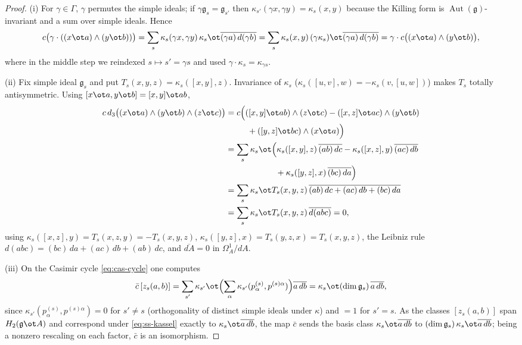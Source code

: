 \documentclass{amsart}
\theoremstyle{definition}
\DeclareMathOperator{\Aut}{Aut}
\newcommand{\g}{\mathfrak{g}}
\newcommand{\Om}{\Omega}
\newcommand{\Gm}{\Gamma}
\begin{document}
\begin{proof}
(i) For $\gamma\in\Gm$, $\gamma$ permutes the simple ideals; if
$\gamma\g_s=\g_{s'}$ then $\kappa_{s'}(\gamma x,\gamma y)=\kappa_s(x,y)$ because the
Killing form is $\Aut(\g)$-invariant and a sum over simple ideals.  Hence
\[
   c\bigl(\gamma\cdot((x\ot a)\wedge(y\ot b))\bigr)
   =\sum_s\kappa_s(\gamma x,\gamma y)\,\kappa_s\ot\overline{(\gamma a)\,d(\gamma b)}
   =\sum_{s}\kappa_{s}(x,y)\,(\gamma\kappa_{s})\ot\overline{(\gamma a)\,d(\gamma b)}
   =\gamma\cdot c\bigl((x\ot a)\wedge(y\ot b)\bigr),
\]
where in the middle step we reindexed $s\mapsto s'=\gamma s$ and used
$\gamma\cdot\kappa_s=\kappa_{\gamma s}$.

(ii) Fix simple ideal $\g_s$ and put $T_s(x,y,z)=\kappa_s([x,y],z)$.  Invariance of
$\kappa_s$ ($\kappa_s([u,v],w)=-\kappa_s(v,[u,w])$) makes $T_s$ totally
antisymmetric.  Using $[x\ot a,y\ot b]=[x,y]\ot ab$,
\[
\begin{aligned}
c\,d_3\bigl((x\ot a)\wedge(y\ot b)\wedge(z\ot c)\bigr)
 &=c\Bigl(([x,y]\ot ab)\wedge(z\ot c)-([x,z]\ot ac)\wedge(y\ot b)\\
 &\hspace{2.6em}+([y,z]\ot bc)\wedge(x\ot a)\Bigr)\\
 &=\sum_s\kappa_s\ot\Bigl(\kappa_s([x,y],z)\,\overline{(ab)\,dc}
   -\kappa_s([x,z],y)\,\overline{(ac)\,db}\\
 &\hspace{6.0em}+\kappa_s([y,z],x)\,\overline{(bc)\,da}\Bigr)\\
 &=\sum_s\kappa_s\ot T_s(x,y,z)\,\overline{(ab)\,dc+(ac)\,db+(bc)\,da}\\
 &=\sum_s\kappa_s\ot T_s(x,y,z)\,\overline{d(abc)}=0,
\end{aligned}
\]
using $\kappa_s([x,z],y)=T_s(x,z,y)=-T_s(x,y,z)$,
$\kappa_s([y,z],x)=T_s(y,z,x)=T_s(x,y,z)$, the Leibniz rule
$d(abc)=(bc)\,da+(ac)\,db+(ab)\,dc$, and $\overline{dA}=0$ in $\Om^1_A/dA$.

(iii) On the Casimir cycle \eqref{eq:cas-cycle} one computes
\[
   \bar c\,[z_s(a,b)]
   =\sum_{s'}\kappa_{s'}\ot\Bigl(\sum_\alpha\kappa_{s'}(p^{(s)}_\alpha,p^{(s)\alpha})\Bigr)\overline{a\,db}
   =\kappa_s\ot(\dim\g_s)\,\overline{a\,db},
\]
since $\kappa_{s'}(p^{(s)}_\alpha,p^{(s)\alpha})=0$ for $s'\ne s$ (orthogonality of
distinct simple ideals under $\kappa$) and $=1$ for $s'=s$.  As the classes
$[z_s(a,b)]$ span $H_2(\g\ot A)$ and correspond under \eqref{eq:ss-kassel} exactly
to $\kappa_s\ot\overline{a\,db}$, the map $\bar c$ sends the basis class
$\kappa_s\ot\overline{a\,db}$ to $(\dim\g_s)\,\kappa_s\ot\overline{a\,db}$; being a
nonzero rescaling on each factor, $\bar c$ is an isomorphism.
\end{proof}
\end{document}
